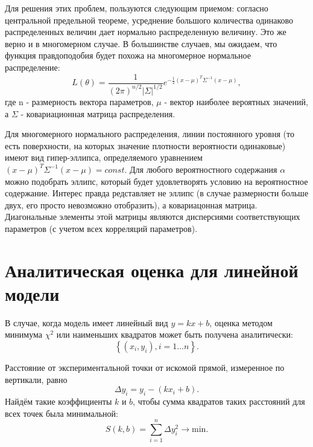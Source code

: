 Для решения этих проблем, пользуются следующим приемом: согласно
центральной предельной теореме, усреднение большого количества одинаково
распределенных величин дает нормально распределенную величину. Это же
верно и в многомерном случае. В большинстве случаев, мы ожидаем, что
функция правдоподобия будет похожа на многомерное нормальное
распределение:
\begin{equation}
    L(\theta) = \frac{1}{(2 \pi)^{n/2}\left|\Sigma\right|^{1/2}} e^{-\frac{1}{2}
(x - \mu)^T \Sigma^{-1} (x - \mu)},
\end{equation}
где n - размерность вектора параметров, $\mu$ - вектор
наиболее вероятных значений, а $\Sigma$ - ковариационная матрица распределения.

Для многомерного нормального распределения, линии постоянного уровня (то
есть поверхности, на которых значение плотности вероятности одинаковые)
имеют вид гипер-эллипса, определяемого уравнением
$(x - \mu)^T \Sigma^{-1} (x - \mu) = const$. Для любого вероятностного
содержания $\alpha$ можно подобрать эллипс, который будет
удовлетворять условию на вероятностное содержание. Интерес правда
редставляет не эллипс (в случае размерности больше двух, его просто
невозможно отобразить), а ковариацонная матрица. Диагональные элементы
этой матрицы являются дисперсиями соответствующих параметров (с учетом
всех корреляций параметров).

\section{Аналитическая оценка для линейной модели}
\label{sec:linear}

В случае, когда модель имеет линейный вид $y=kx+b$, оценка методом минимума
$\chi^2$ или наименьших квадратов может быть получена аналитически:
\[
    \left\{ \left(x_{i},y_{i}\right),i=1\ldots n\right\} .
\]

Расстояние от экспериментальной точки от искомой прямой, измеренное
по вертикали, равно
\[
    \Delta y_{i}=y_{i}-\left(kx_{i}+b\right).
\]
Найдём такие коэффициенты $k$ и $b$, чтобы сумма квадратов таких
расстояний для всех точек была минимальной:
\begin{equation}
    \label{eq:mnk_S}
    S\!\left(k,b\right)=\sum\limits _{i=1}^{n}\Delta
    y_{i}^{2}\to\mathrm{min}.
\end{equation}

